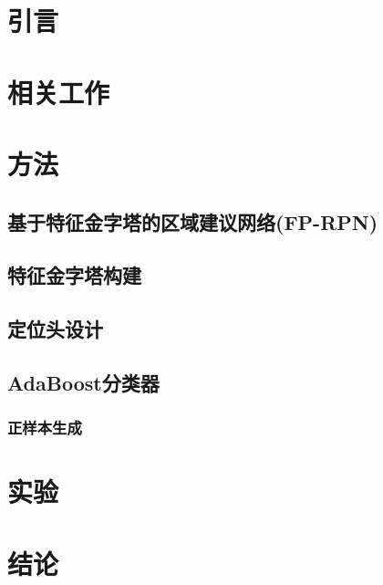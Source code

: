 \documentclass[a4paper,12pt]{ctexart}
\begin{document}
\section{引言}

\section{相关工作}

\section{方法}

\subsection{基于特征金字塔的区域建议网络(FP-RPN)}

\subsection{特征金字塔构建}

\subsection{定位头设计}

\subsection{AdaBoost分类器}

\subsubsection{正样本生成}

\section{实验}

\section{结论}
\end{document}
